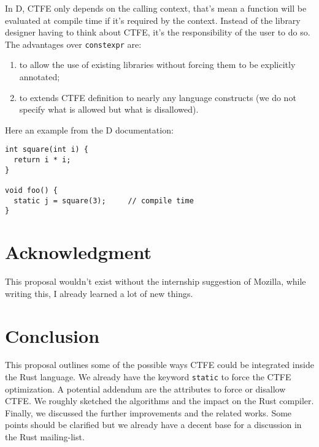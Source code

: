 \documentclass[a4paper,11pt]{article}
\begin{document}
In D, CTFE only depends on the calling context, that's mean a function will be evaluated at compile time if it's required by the context. Instead of the library designer having to think about CTFE, it's the responsibility of the user to do so. The advantages over \lstinline{constexpr} are:

\begin{enumerate}
\item to allow the use of existing libraries without forcing them to be explicitly annotated;
\item to extends CTFE definition to nearly any language constructs (we do not specify what is allowed but what is disallowed).
\end{enumerate}

Here an example from the D documentation\cite{D_CTFE}:

\begin{lstlisting}
int square(int i) {
  return i * i;
}

void foo() {
  static j = square(3);     // compile time
}
\end{lstlisting}

\section{Acknowledgment}

This proposal wouldn't exist without the internship suggestion of Mozilla, while writing this, I already learned a lot of new things.

\section{Conclusion}

This proposal outlines some of the possible ways CTFE could be integrated inside the Rust language. We already have the keyword \lstinline{static} to force the CTFE optimization. A potential addendum are the attributes to force or disallow CTFE. We roughly sketched the algorithms and the impact on the Rust compiler. Finally, we discussed the further improvements and the related works. Some points should be clarified but we already have a decent base for a discussion in the Rust mailing-list.

\newpage
{}

\end{document}
